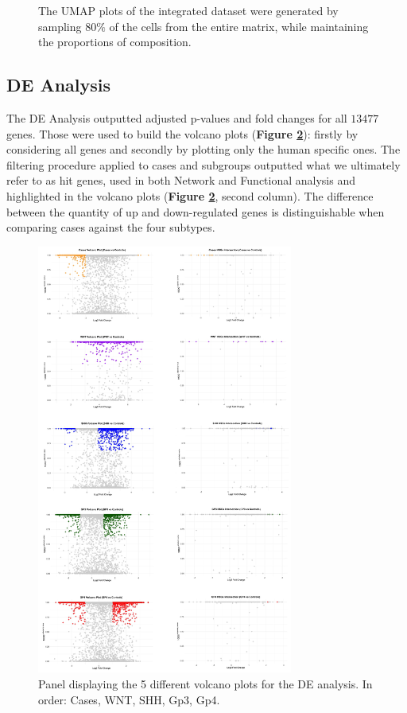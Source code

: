 \documentclass[10pt]{SelfArx} %
\begin{document}
\begin{figure}[H]
\begin{minipage}{0.48\textwidth}
    \end{minipage}
    \caption{The UMAP plots of the integrated dataset were generated by sampling $80\%$ of the cells from the entire matrix, while maintaining the proportions of composition.}
    \label{fig:GSE_integrated}
\end{figure}


\subsection{DE Analysis}\label{sec:DE_results}
The DE Analysis outputted adjusted p-values and fold changes for all $13477$ genes. Those were used to build the volcano plots (\textbf{Figure \ref{fig:panel_volcano}}): firstly by considering all genes and secondly by plotting only the human specific ones. The filtering procedure applied to cases and subgroups outputted what we ultimately refer to as hit genes, used in both Network and Functional analysis and highlighted in the volcano plots (\textbf{Figure \ref{fig:panel_volcano}}, second column).
The difference between the quantity of up and down-regulated genes is distinguishable when comparing cases against the four subtypes.

\begin{figure}[h!]
    \centering
    \includegraphics[width=0.75\textwidth]{project-report/figures/volcano_panel2.png}
    \caption{Panel displaying the 5 different volcano plots for the DE analysis. In order: Cases, WNT, SHH, Gp3, Gp4.}
    \label{fig:panel_volcano}    
\end{figure}
\end{document}
